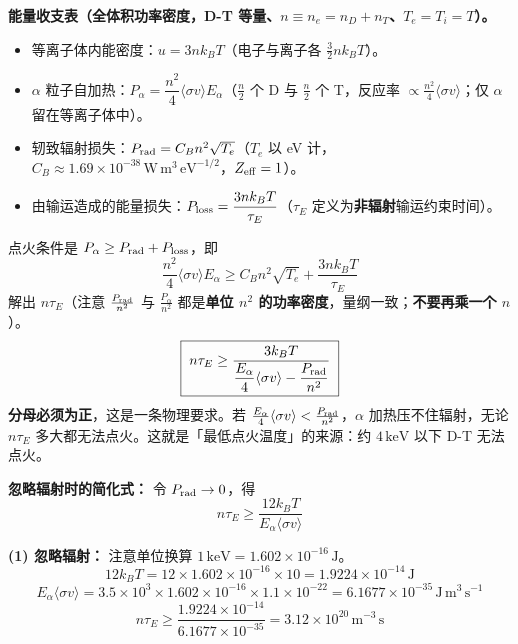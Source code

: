 \textbf{能量收支表（全体积功率密度，D-T 等量、$n\equiv n_e=n_D+n_T$、$T_e=T_i=T$）。}
\begin{itemize}
    \item 等离子体内能密度：$u=3nk_BT$（电子与离子各 $\tfrac32nk_BT$）。
    \item $\alpha$ 粒子自加热：$P_\alpha=\dfrac{n^2}{4}\langle\sigma v\rangle E_\alpha$（$\tfrac{n}{2}$ 个 D 与 $\tfrac{n}{2}$ 个 T，反应率 $\propto \tfrac{n^2}{4}\langle\sigma v\rangle$；仅 $\alpha$ 留在等离子体中）。
    \item 轫致辐射损失：$P_{\rm rad}=C_B n^2\sqrt{T_e}$（$T_e$ 以 eV 计，$C_B\approx1.69\times10^{-38}\,\mathrm{W\,m^3\,eV^{-1/2}}$，$Z_{\rm eff}=1$）。
    \item 由输运造成的能量损失：$P_{\rm loss}=\dfrac{3nk_BT}{\tau_E}$（$\tau_E$ 定义为\textbf{非辐射}输运约束时间）。
\end{itemize}
点火条件是 $P_\alpha\ge P_{\rm rad}+P_{\rm loss}$，即
\begin{equation}
    \frac{n^2}{4}\langle\sigma v\rangle E_\alpha \ge C_B n^2\sqrt{T_e} + \frac{3nk_BT}{\tau_E}
\label{eq:ch10-lawson-full}
\end{equation}
解出 $n\tau_E$（注意 $\tfrac{P_{\rm rad}}{n^2}$ 与 $\tfrac{P_\alpha}{n^2}$ 都是\textbf{单位 $n^2$ 的功率密度}，量纲一致；\textbf{不要再乘一个 $n$}）。
\begin{equation}
    \boxed{\;n\tau_E \ge \frac{3k_BT}{\dfrac{E_\alpha}{4}\langle\sigma v\rangle - \dfrac{P_{\rm rad}}{n^2}}\;}
\label{eq:ch10-lawson-full-solved}
\end{equation}
\textbf{分母必须为正}，这是一条物理要求。若 $\tfrac{E_\alpha}{4}\langle\sigma v\rangle<\tfrac{P_{\rm rad}}{n^2}$，$\alpha$ 加热压不住辐射，无论 $n\tau_E$ 多大都无法点火。这就是「最低点火温度」的来源：约 $4\,\mathrm{keV}$ 以下 D-T 无法点火。

\textbf{忽略辐射时的简化式：} 令 $P_{\rm rad}\to0$，得
\begin{equation}
    n\tau_E \ge \frac{12k_B T}{E_{\alpha}\langle\sigma v\rangle}
\label{eq:ch10-lawson-simplified}
\end{equation}

\textbf{(1) 忽略辐射：} 注意单位换算 $1\,\mathrm{keV}=1.602\times10^{-16}\,\mathrm{J}$。
\[
    12k_BT = 12\times1.602\times10^{-16}\times10 = 1.9224\times10^{-14}\,\mathrm{J}
\]
\[
    E_\alpha\langle\sigma v\rangle = 3.5\times10^3\times1.602\times10^{-16}\times1.1\times10^{-22}
    = 6.1677\times10^{-35}\,\mathrm{J\,m^3\,s^{-1}}
\]
\[
    n\tau_E \ge \frac{1.9224\times10^{-14}}{6.1677\times10^{-35}} = 3.12\times10^{20}\,\mathrm{m^{-3}\,s}
\]


